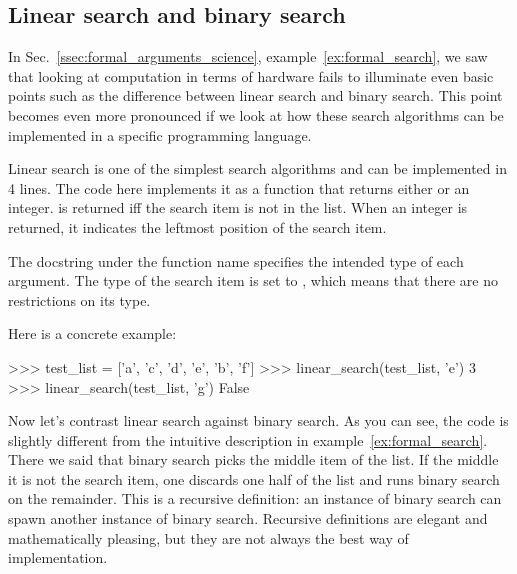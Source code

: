 \begin{programming}
\label{sec:formal_code}

\subsection{Linear search and binary search}
\label{ssec:formal_code_search}

In Sec.~\ref{ssec:formal_arguments_science}, example~\ref{ex:formal_search}, we saw that looking at computation in terms of hardware fails to illuminate even basic points such as the difference between linear search and binary search.
This point becomes even more pronounced if we look at how these search algorithms can be implemented in a specific programming language.

Linear search is one of the simplest search algorithms and can be implemented in 4 lines.
The code here implements it as a function that returns either  or an integer.
 is returned iff the search item is not in the list.
When an integer is returned, it indicates the leftmost position of the search item.

The docstring under the function name specifies the intended type of each argument.
The type of the search item is set to , which means that there are no restrictions on its type.

\begin{center}
\end{center}

Here is a concrete example:

\begin{center}
    \begin{pythoncode}
        >>> test_list = ['a', 'c', 'd', 'e', 'b', 'f']
        >>> linear_search(test_list, 'e')
        3
        >>> linear_search(test_list, 'g')
        False
    \end{pythoncode}
\end{center}

Now let's contrast linear search against binary search.
As you can see, the code is slightly different from the intuitive description in example~\ref{ex:formal_search}.
There we said that binary search picks the middle item of the list.
If the middle it is not the search item, one discards one half of the list and runs binary search on the remainder.
This is a recursive definition: an instance of binary search can spawn another instance of binary search.
Recursive definitions are elegant and mathematically pleasing, but they are not always the best way of implementation.


\end{programming}
